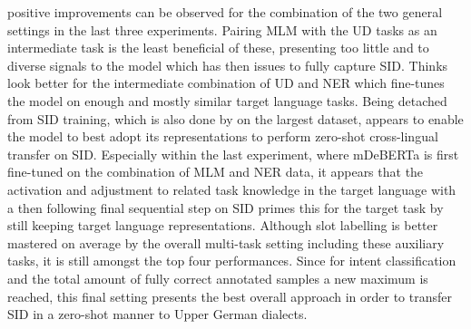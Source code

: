 \documentclass[11pt,a4paper,twoside,openright]{scrbook}
\begin{document}
positive improvements can be observed for the combination of the two general settings in the last three experiments. Pairing MLM with the UD tasks as an intermediate task is the least beneficial of these, presenting too little and to diverse signals to the model which has then issues to fully capture SID. Thinks look better for the intermediate combination of UD and NER which fine-tunes the model on enough and mostly similar target language tasks. Being detached from SID training, which is also done by on the largest dataset, appears to enable the model to best adopt its representations to perform zero-shot cross-lingual transfer on SID. Especially within the last experiment, where mDeBERTa is first fine-tuned on the combination of MLM and NER data, it appears that the activation and adjustment to related task knowledge in the target language with a then following final sequential step on SID primes this for the target task by still keeping target language representations. Although slot labelling is better mastered on average by the overall multi-task setting including these auxiliary tasks, it is still amongst the top four performances. Since for intent classification and the total amount of fully correct annotated samples a new maximum is reached, this final setting presents the best overall approach in order to transfer SID in a zero-shot manner to Upper German dialects. 
\end{document}
